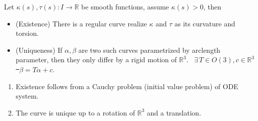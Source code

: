\begin{theorem}
    Let \(\kappa(s),\tau(s)\colon I\to \mathbb{R}\) be smooth functions, assume
    \(\kappa(s)>0\), then
    \begin{itemize}
        \item (Existence) There is a regular curve realize \(\kappa\) and \(\tau\)
            as its curvature and torsion.
        \item (Uniqueness) If \(\alpha,\beta\) are two such curves parametrized by
            arclength parameter, then they only differ by a rigid motion of
            \(\mathbb{R}^3\). \ie\ \(\exists\,T\in O(3),c\in \mathbb{R}^3\) \st\ 
            \(\beta=T\alpha+c\).
    \end{itemize}
\end{theorem}
\begin{remark}\hfill
\begin{enumerate}[(1)]
    \item Existence follows from a Cauchy problem (initial value problem) of
        ODE system.
    \item The curve is unique up to a rotation of \(\mathbb{R}^3\) and a translation.
\end{enumerate}
\end{remark}

